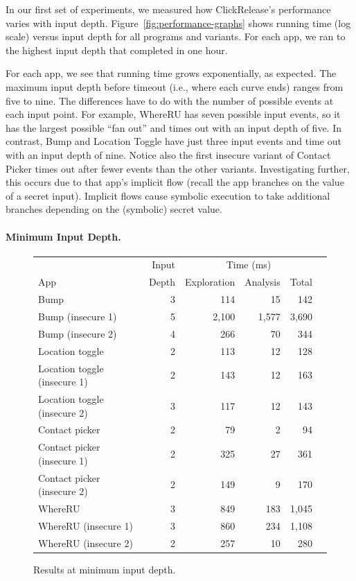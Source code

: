 \documentclass{llncs}
\newcommand{\toolname}{ClickRelease\xspace}
\begin{document}
In our first set of experiments, we measured how
\toolname{}'s performance varies with input
depth. Figure~\ref{fig:performance-graphs} shows running time (log scale)
versus input depth for all programs and variants.
For each app, we ran to the highest input depth that completed in
one hour.

For each app, we see that running time
grows exponentially, as expected. The maximum input depth
before timeout (i.e., where each curve ends) ranges from five to
nine. The differences have to do with the number of possible events at
each input point. For example, WhereRU has seven possible input events, so
it has the largest possible ``fan out'' and times out with an input
depth of five. In contrast, Bump and Location Toggle have just three
input events and time out with an input depth of nine. Notice also the first
insecure variant of Contact Picker times out after fewer events than
the other variants. Investigating further, this occurs due to
that app's implicit flow (recall the app branches on the value of a
secret input). Implicit flows cause symbolic execution to take
additional branches depending on the (symbolic) secret value.

\paragraph*{Minimum Input Depth.}

\begin{figure}[t]
\centering
\begin{tabular}{ | l | r | r | r | r | r | }
  \hline
  &Input&\multicolumn{3}{c|}{Time (ms)} \\ \cline{3-5}
App & Depth & Exploration & Analysis & Total \\ \hline
  \hline
  Bump & 3 & 114 &  15 & 142 \\
  Bump (insecure 1) & 5 & 2,100 & 1,577 & 3,690 \\
  Bump (insecure 2) & 4 & 266 & 70 & 344 \\\hline
  Location toggle & 2 &  113 & 12 & 128 \\
  Location toggle (insecure 1) & 2 &  143 & 12 & 163 \\
  Location toggle (insecure 2) & 3 & 117 & 12 & 143 \\\hline
  Contact picker & 2 &  79 & 2 & 94 \\
  Contact picker (insecure 1) & 2 &  325 & 27 & 361 \\
  Contact picker (insecure 2) & 2 &  149 & 9 & 170 \\\hline
  WhereRU & 3 & 849 & 183 & 1,045 \\
  WhereRU (insecure 1) & 3 & 860 & 234 & 1,108 \\
  WhereRU (insecure 2) & 2 & 257 & 10 & 280 \\
  \hline
\end{tabular}
\caption{Results at minimum input depth.}
\label{fig:results}
\end{figure}
\end{document}
